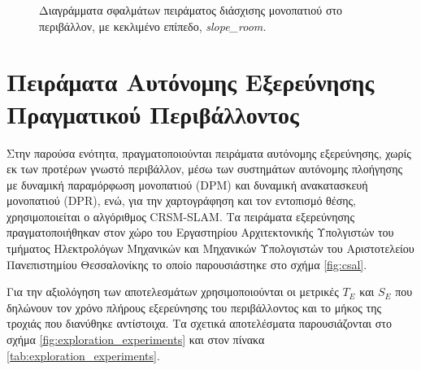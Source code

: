 \begin{figure}[!ht]
	\caption{Διαγράμματα σφαλμάτων πειράματος διάσχισης μονοπατιού στο περιβάλλον, με κεκλιμένο επίπεδο, \textit{slope{\_}room.}}
	\label{fig:slope_room_errors}
\end{figure}

\FloatBarrier

\section{Πειράματα Αυτόνομης Εξερεύνησης Πραγματικού Περιβάλλοντος} \label{exploration_experiments}
Στην παρούσα ενότητα, πραγματοποιούνται πειράματα αυτόνομης εξερεύνησης, χωρίς εκ των προτέρων  γνωστό περιβάλλον, μέσω των συστημάτων αυτόνομης πλοήγησης με δυναμική παραμόρφωση μονοπατιού (DPM) και δυναμική ανακατασκευή μονοπατιού (DPR), ενώ, για την χαρτογράφηση και τον εντοπισμό θέσης, χρησιμοποιείται ο αλγόριθμος CRSM-SLAM. Τα πειράματα εξερεύνησης πραγματοποιήθηκαν στον χώρο του Εργαστηρίου Αρχιτεκτονικής Υπολγιστών του τμήματος Ηλεκτρολόγων Μηχανικών και Μηχανικών Υπολογιστών του Αριστοτελείου Πανεπιστημίου Θεσσαλονίκης το οποίο παρουσιάστηκε στο σχήμα \ref{fig:csal}. 

\bigskip
Για την αξιολόγηση των αποτελεσμάτων χρησιμοποιούνται οι μετρικές $T_{E}$ και $S_{E}$ που δηλώνουν τον χρόνο πλήρους εξερεύνησης του περιβάλλοντος και το μήκος της τροχιάς που διανύθηκε αντίστοιχα. Τα σχετικά αποτελέσματα παρουσιάζονται στο σχήμα \ref{fig:exploration_experiments} και στον πίνακα \ref{tab:exploration_experiments}.

